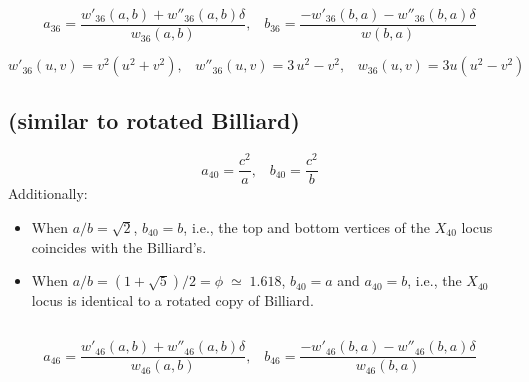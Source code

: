 \begin{equation*}
    a_{36}=\frac{w'_{36}(a,b)+ w''_{36}(a,b)\delta }{w_{36}(a,b)},\;\;\;b_{36}=\frac{  -w'_{36}(b,a)  -w''_{36}(b,a)\delta}{w(b,a)}
\end{equation*}

\begin{equation*}
w'_{36}(u,v)=	{v}^{2} \left( {u}^{2}+{v}^{2} \right),\;\;\;w''_{36}(u,v)=  3\,{u}^{2}-{v}^{2},\;\;\;
w_{36}(u,v)=3u \left(u^2-v^2\right)
\end{equation*}

\subsection{ (similar to rotated Billiard)}
\label{app:x40}
\begin{equation*}
a_{40}=\frac{ c^2}{a},\;\;\;
b_{40}=\frac{ c^2}{b}
\end{equation*}
Additionally:
\begin{itemize}
\item When $a/b= \sqrt{2}$, $b_{40}=b$, i.e., the top and bottom vertices of the $X_{40}$ locus coincides with the Billiard's.

\item When $a/b=(1+\sqrt{5})/2=\phi\;{\simeq}\;1.618$, $b_{40}=a$ and $a_{40}=b$, i.e., the $X_{40}$ locus is identical to a rotated copy of Billiard.
\end{itemize}

\subsection{}
      

\begin{equation*}
    a_{46}=\frac{w'_{46}(a,b)+w''_{46}(a,b) \delta}{ w_{46}(a,b) },\;\;\;b_{46}=\frac{-w'_{46}(b,a) - w''_{46}(b,a)\delta}{ w_{46}(b,a) }
\end{equation*}

